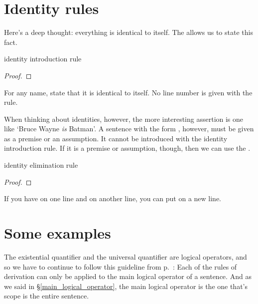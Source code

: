 
\section{Identity rules}

Here's a deep thought: everything is identical to itself. The  allows us to state this fact.

\begin{factboxy}{identity introduction rule}
\begin{proof}
	 \ii{}
\end{proof}

\small{For any name, state that it is identical to itself. No line number is given with the rule.}
\end{factboxy}

When thinking about identities, however, the more interesting assertion is one like `Bruce Wayne \textit{is} Batman'. A sentence with the form , however, must be given as a premise or an assumption. It cannot be introduced with the identity introduction rule. If it is a premise or assumption, though, then we can use the .  

\begin{factboxy}{identity elimination rule}
\begin{proof}
	 
\end{proof}

\small{If you have  on one line and  on another line, you can put  on a new line.}
\end{factboxy}




\section{Some examples}

The existential quantifier and the universal quantifier are logical operators, and so we have to continue to follow this guideline from p.~\pageref{rule-proofs-main-operator}: {Each of the rules of derivation can only be applied to the main logical operator of a sentence}. And as we said in \S \ref{main_logical_operator}, the main logical operator is the one that's scope is the entire sentence. 

